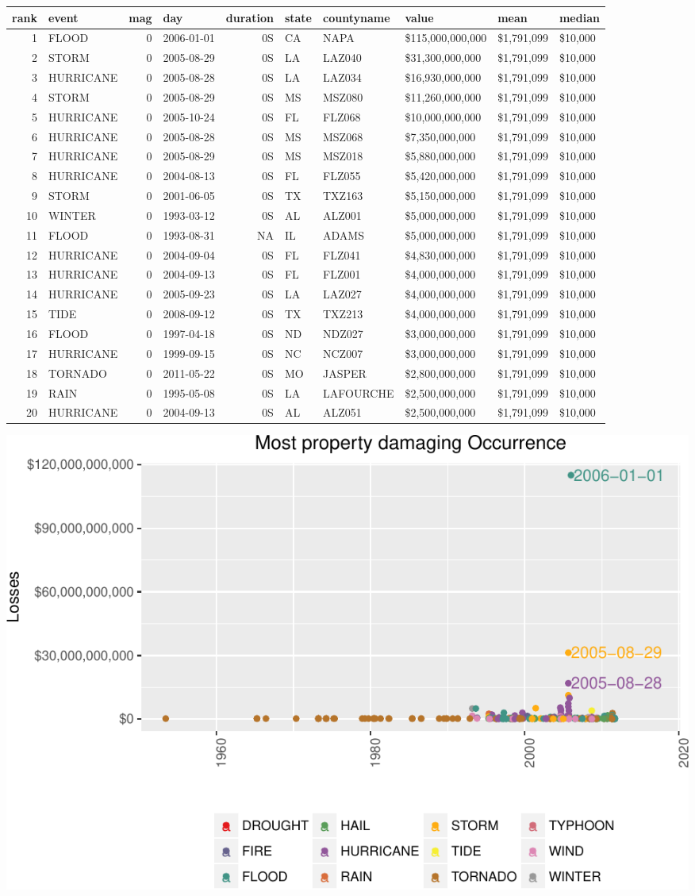 \documentclass[]{article}
\begin{document}
\begin{longtable}[]{@{}rlrlrlllll@{}}
\toprule
rank & event & mag & day & duration & state & countyname & value & mean
& median\tabularnewline
\midrule
\endhead
1 & FLOOD & 0 & 2006-01-01 & 0S & CA & NAPA & \$115,000,000,000 &
\$1,791,099 & \$10,000\tabularnewline
2 & STORM & 0 & 2005-08-29 & 0S & LA & LAZ040 & \$31,300,000,000 &
\$1,791,099 & \$10,000\tabularnewline
3 & HURRICANE & 0 & 2005-08-28 & 0S & LA & LAZ034 & \$16,930,000,000 &
\$1,791,099 & \$10,000\tabularnewline
4 & STORM & 0 & 2005-08-29 & 0S & MS & MSZ080 & \$11,260,000,000 &
\$1,791,099 & \$10,000\tabularnewline
5 & HURRICANE & 0 & 2005-10-24 & 0S & FL & FLZ068 & \$10,000,000,000 &
\$1,791,099 & \$10,000\tabularnewline
6 & HURRICANE & 0 & 2005-08-28 & 0S & MS & MSZ068 & \$7,350,000,000 &
\$1,791,099 & \$10,000\tabularnewline
7 & HURRICANE & 0 & 2005-08-29 & 0S & MS & MSZ018 & \$5,880,000,000 &
\$1,791,099 & \$10,000\tabularnewline
8 & HURRICANE & 0 & 2004-08-13 & 0S & FL & FLZ055 & \$5,420,000,000 &
\$1,791,099 & \$10,000\tabularnewline
9 & STORM & 0 & 2001-06-05 & 0S & TX & TXZ163 & \$5,150,000,000 &
\$1,791,099 & \$10,000\tabularnewline
10 & WINTER & 0 & 1993-03-12 & 0S & AL & ALZ001 & \$5,000,000,000 &
\$1,791,099 & \$10,000\tabularnewline
11 & FLOOD & 0 & 1993-08-31 & NA & IL & ADAMS & \$5,000,000,000 &
\$1,791,099 & \$10,000\tabularnewline
12 & HURRICANE & 0 & 2004-09-04 & 0S & FL & FLZ041 & \$4,830,000,000 &
\$1,791,099 & \$10,000\tabularnewline
13 & HURRICANE & 0 & 2004-09-13 & 0S & FL & FLZ001 & \$4,000,000,000 &
\$1,791,099 & \$10,000\tabularnewline
14 & HURRICANE & 0 & 2005-09-23 & 0S & LA & LAZ027 & \$4,000,000,000 &
\$1,791,099 & \$10,000\tabularnewline
15 & TIDE & 0 & 2008-09-12 & 0S & TX & TXZ213 & \$4,000,000,000 &
\$1,791,099 & \$10,000\tabularnewline
16 & FLOOD & 0 & 1997-04-18 & 0S & ND & NDZ027 & \$3,000,000,000 &
\$1,791,099 & \$10,000\tabularnewline
17 & HURRICANE & 0 & 1999-09-15 & 0S & NC & NCZ007 & \$3,000,000,000 &
\$1,791,099 & \$10,000\tabularnewline
18 & TORNADO & 0 & 2011-05-22 & 0S & MO & JASPER & \$2,800,000,000 &
\$1,791,099 & \$10,000\tabularnewline
19 & RAIN & 0 & 1995-05-08 & 0S & LA & LAFOURCHE & \$2,500,000,000 &
\$1,791,099 & \$10,000\tabularnewline
20 & HURRICANE & 0 & 2004-09-13 & 0S & AL & ALZ051 & \$2,500,000,000 &
\$1,791,099 & \$10,000\tabularnewline
\bottomrule
\end{longtable}

\includegraphics{readme_files/figure-latex/prop-single-plot-1.pdf}
\end{document}
